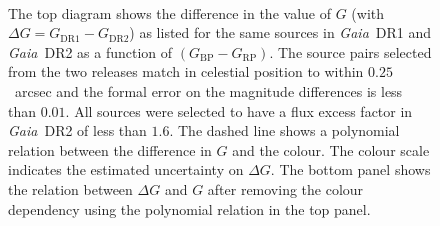 \documentclass[longauth]{aa_gaia} %
\newcommand\gaia{\textit{Gaia}}
\newcommand\gdr[1]{\gaia~DR#1}
\newcommand\gbp{\ensuremath{G_\mathrm{BP}}}
\newcommand\grp{\ensuremath{G_\mathrm{RP}}}
\begin{document}
\begin{figure}[t]
  \centering
  \\
  \caption{The top diagram shows the difference in the value of $G$ (with $\Delta G =
    G_\mathrm{DR1}-G_\mathrm{DR2}$) as listed for the same sources in \gdr{1} and \gdr{2} as a
    function of $(\gbp-\grp)$. The source pairs selected from the two releases match in celestial
    position to within $0.25$~arcsec and the formal error on the magnitude differences is less than
    $0.01$. All sources were selected to have a flux excess factor in \gdr{2} of less than $1.6$.
    The dashed line shows a polynomial relation between the difference in $G$ and the colour. The
    colour scale indicates the estimated uncertainty on $\Delta G$. The bottom panel shows the
    relation between $\Delta G$ and $G$ after removing the colour dependency using the polynomial
  relation in the top panel.\label{fig:gdiffs}}
\end{figure}
\end{document}
